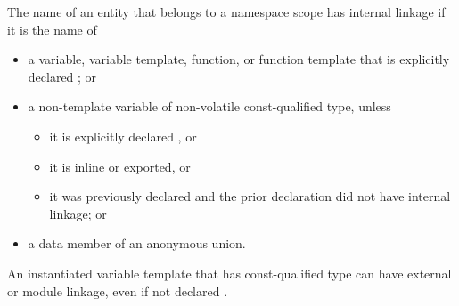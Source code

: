 \pnum
{}%
%
%
%
%
%
The name of an entity
that belongs to a namespace scope
has internal linkage if it is the name of
\begin{itemize}
\item
  a variable, variable template, function, or function template that is
  explicitly declared ; or
\item
  a non-template variable of non-volatile const-qualified type, unless
  \begin{itemize}
  \item it is explicitly declared , or
  \item it is inline or exported, or
  \item it was previously declared and the prior declaration did
  not have internal linkage; or
  \end{itemize}
\item
  a data member of an anonymous union.
\end{itemize}
\begin{note}
An instantiated variable template that has const-qualified type
can have external or module linkage, even if not declared .
\end{note}

